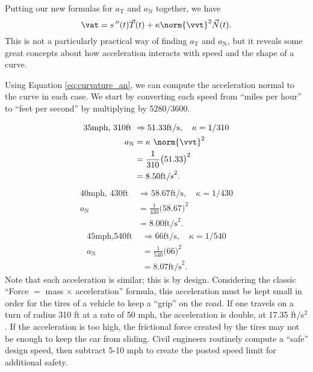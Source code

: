 Putting our new formulas for $a_\text{T}$ and $a_\text{N}$ together, we have 
\[
\vat = s\,''(t)\vec T(t) + \kappa\norm{\vvt}^2\vec N(t).
\]
This is not a particularly practical way of finding $a_\text{T}$ and $a_\text{N}$, but it reveals some great concepts about how acceleration interacts with speed and the shape of a curve.\\

{
Using Equation \eqref{eq:curvature_an}, we can compute the acceleration normal to the curve in each case. We start by converting each speed from ``miles per hour'' to ``feet per second'' by multiplying by $5280/3600$.

\begin{align*}
\text{35mph, 310ft } &\Rightarrow 51.33\text{ft/s},\quad \kappa = 1/310 \\
			a_\text{N}&= \kappa\ \norm{\vvt}^2\\ 
							&= \frac1{310}\big(51.33\big)^2 \\
							&= 8.50\text{ft/s}^2.
\end{align*}
\begin{align*}
\text{40mph, 430ft } &\Rightarrow 58.67\text{ft/s},\quad \kappa = 1/430 \\
			a_\text{N}&= \frac1{430}\big(58.67\big)^2 \\
							&= 8.00\text{ft/s}^2.
\end{align*}
\begin{align*}
\text{45mph,540ft } &\Rightarrow 66\text{ft/s},\quad \kappa = 1/540 \\
			a_\text{N}&= \frac1{540}\big(66\big)^2 \\
							&= 8.07\text{ft/s}^2.
\end{align*}
Note that each acceleration is similar; this is by design. Considering the classic ``Force $=$ mass $\times$ acceleration'' formula, this acceleration must be kept small in order for the tires of a vehicle to keep a ``grip'' on the road. If one travels on a turn of radius 310 ft at a rate of 50 mph, the acceleration is double, at 17.35 ft/s$^2$. If the acceleration is too high, the frictional force created by the tires may not be enough to keep the car from sliding. Civil engineers routinely compute a ``safe'' design speed, then subtract 5-10 mph to create the posted speed limit for additional safety.
}\\

